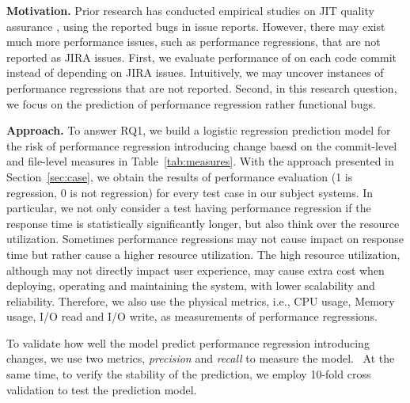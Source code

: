  \textbf{Motivation.}
Prior research has conducted empirical studies on JIT quality assurance \cite{emadjit}, using the reported bugs in issue reports. However, there may exist much more performance issues, such as performance regressions, that are not reported as JIRA issues. First, we evaluate performance of on each code commit instead of depending on JIRA issues. Intuitively, we may uncover instances of performance regressions that are not reported. Second, in this research question, we focus on the prediction of performance regression rather functional bugs.

 \textbf{Approach.}
To answer RQ1, we build a logistic regression prediction model for the risk of performance regression introducing change baesd on the commit-level and file-level measures in Table~\ref{tab:measures}. With the approach presented in Section~\ref{sec:case}, we obtain the results of performance evaluation (1 is regression, 0 is not regression) for every test case in our subject systems. In particular, we not only consider a test having performance regression if the response time is statistically significantly longer, but also think over the resource utilization. Sometimes performance regressions may not cause impact on response time but rather cause a higher resource utilization. The high resource utilization, although may not directly impact user experience, may cause extra cost when deploying, operating and maintaining the system, with lower scalability and reliability. 
Therefore, we also use the physical metrics, i.e., CPU usage, Memory usage, I/O read and I/O write, as measurements of performance regressions. 

To validate how well the model predict performance regression introducing changes, we use two metrics, \emph{precision} and \emph{recall} to measure the model.  At the same time, to verify the stability of the prediction, we employ 10-fold cross validation to test the prediction model.

